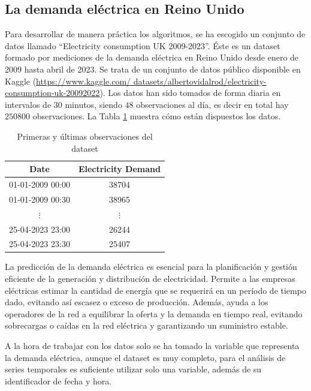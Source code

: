 \documentclass[12pt,twoside]{article}
\begin{document}
\subsection{La demanda eléctrica en Reino Unido}
Para desarrollar de manera práctica los algoritmos, se ha escogido un conjunto de datos llamado
``Electricity consumption UK 2009-2023''. Éste es un dataset formado por mediciones de la demanda eléctrica en Reino Unido desde enero de 2009 hasta abril de 2023. Se trata de un conjunto de datos público disponible en Kaggle (\href{https://www.kaggle.com/datasets/albertovidalrod/electricity-consumption-uk-20092022}{https://www.kaggle.com/ datasets/albertovidalrod/electricity-consumption-uk-20092022}). Los datos han sido tomados de forma diaria en intervalos de $30$ minutos, siendo $48$ observaciones al día, es decir en total hay $250800$ observaciones. La Tabla \ref{tab:dataset} muestra cómo están dispuestos los datos.
\begin{table}[h] 
\centering
\begin{tabular}{cc} \hline
    Date & Electricity Demand  \\ \hline
    01-01-2009 00:00 & 38704 \\
    01-01-2009 00:30 & 38965 \\
    $\vdots$ & $\vdots$ \\
    25-04-2023 23:00 & 26244 \\
    25-04-2023 23:30 & 25407 \\ \hline
\end{tabular}
\caption{Primeras y últimas observaciones del dataset
} \label{tab:dataset}
\end{table}

La predicción de la demanda eléctrica es esencial para la planificación y gestión eficiente de la generación y distribución de electricidad. Permite a las empresas eléctricas estimar la cantidad de energía que se requerirá en un período de tiempo dado, evitando así escasez o exceso de producción. Además, ayuda a los operadores de la red a equilibrar la oferta y la demanda en tiempo real, evitando sobrecargas o caídas en la red eléctrica y garantizando un suministro estable. 

A la hora de trabajar con los datos solo se ha tomado la variable que representa la demanda eléctrica, aunque el dataset es muy completo, para el análisis de series temporales es suficiente utilizar solo una variable, además de su identificador de fecha y hora.
\end{document}
